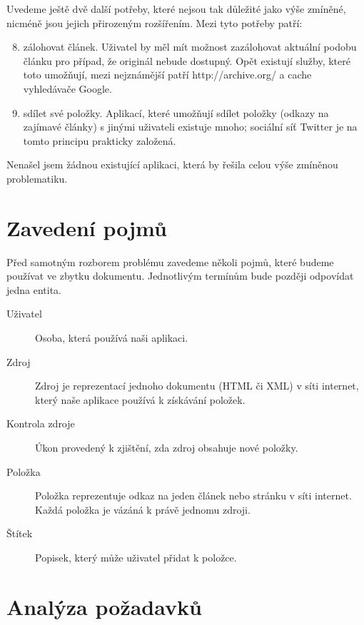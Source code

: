 Uvedeme ještě dvě další potřeby, které nejsou tak důležité jako výše zmíněné, nicméně jsou jejich přirozeným rozšířením.
Mezi tyto potřeby patří:

\begin{enumerate}
	\setcounter{enumi}{7}
	\item zálohovat článek.
		Uživatel by měl mít možnost zazálohovat aktuální podobu článku pro případ, že originál nebude dostupný.
		Opět existují služby, které toto umožňují, mezi nejznámější patří http://archive.org/ a cache vyhledávače Google.
	\item sdílet své položky.
		Aplikací, které umožňují sdílet položky (odkazy na zajímavé články) s jinými uživateli existuje mnoho; sociální síť Twitter je na tomto principu prakticky založená.
\end{enumerate}

\begin{leftbar}
	Nenašel jsem žádnou existující aplikaci, která by řešila celou výše zmíněnou problematiku.
\end{leftbar}

\section{Zavedení pojmů}

Před samotným rozborem problému zavedeme několi pojmů, které budeme používat ve zbytku dokumentu.
Jednotlivým termínům bude později odpovídat jedna entita.


\begin{description}
    \item[Uživatel] Osoba, která používá naši aplikaci.
    \item[Zdroj] Zdroj je reprezentací jednoho dokumentu (HTML či XML) v síti internet, který naše aplikace používá k získávání položek.
	\item[Kontrola zdroje] Úkon provedený k zjištění, zda zdroj obsahuje nové položky.
    \item[Položka] Položka reprezentuje odkaz na jeden článek nebo stránku v síti internet.
		Každá položka je vázáná k právě jednomu zdroji.
    \item[Štítek] Popisek, který může uživatel přidat k položce. %
\end{description}

\section{Analýza požadavků}

